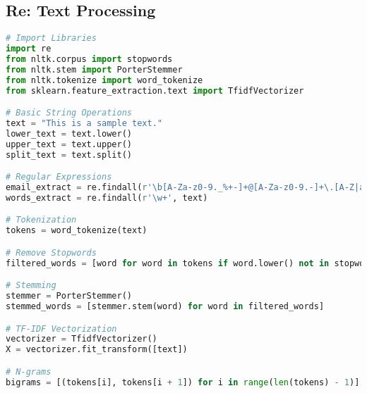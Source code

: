 \documentclass[english, threecolumn]{latex4ei/latex4ei_sheet}
\begin{document}
\begin{sectionbox}
\subsection{Re: Text Processing}
\begin{lstlisting}[language=Python, gobble=0]
# Import Libraries
import re
from nltk.corpus import stopwords
from nltk.stem import PorterStemmer
from nltk.tokenize import word_tokenize
from sklearn.feature_extraction.text import TfidfVectorizer

# Basic String Operations
text = "This is a sample text."
lower_text = text.lower()
upper_text = text.upper()
split_text = text.split()

# Regular Expressions
email_extract = re.findall(r'\b[A-Za-z0-9._%+-]+@[A-Za-z0-9.-]+\.[A-Z|a-z]{2,}\b', text)
words_extract = re.findall(r'\w+', text)

# Tokenization
tokens = word_tokenize(text)

# Remove Stopwords
filtered_words = [word for word in tokens if word.lower() not in stopwords.words('english')]

# Stemming
stemmer = PorterStemmer()
stemmed_words = [stemmer.stem(word) for word in filtered_words]

# TF-IDF Vectorization
vectorizer = TfidfVectorizer()
X = vectorizer.fit_transform([text])

# N-grams
bigrams = [(tokens[i], tokens[i + 1]) for i in range(len(tokens) - 1)]

\end{lstlisting}

\end{sectionbox}

\end{document}
